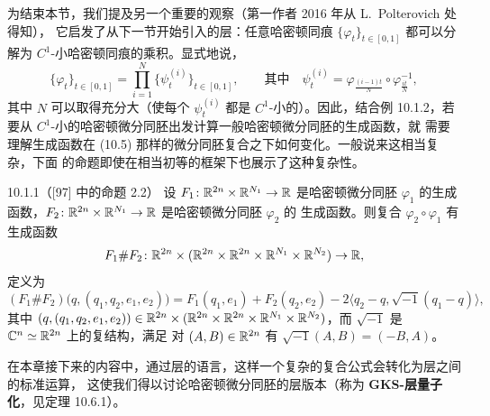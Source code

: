 为结束本节，我们提及另一个重要的观察（第一作者 2016 年从 L.~Polterovich 处得知），
它启发了从下一节开始引入的层：任意哈密顿同痕 $\{\varphi_t\}_{t\in[0,1]}$ 都可以分解为
$C^1$-小哈密顿同痕的乘积。显式地说，
\begin{equation}\tag{10.5}
  \{\varphi_t\}_{t\in[0,1]}
  =\prod_{i=1}^{N}\{\psi_t^{(i)}\}_{t\in[0,1]},
  \qquad\text{其中}\quad
  \psi_t^{(i)}=\varphi_{\frac{(i-1)t}{N}}\circ\varphi_{\frac{it}{N}}^{-1},
\end{equation}
其中 $N$ 可以取得充分大（使每个 $\psi_t^{(i)}$ 都是 $C^1$-小的）。因此，结合例
10.1.2，若要从 $C^1$-小的哈密顿微分同胚出发计算一般哈密顿微分同胚的生成函数，就
需要理解生成函数在 (10.5) 那样的微分同胚复合之下如何变化。一般说来这相当复杂，下面
的命题即使在相当初等的框架下也展示了这种复杂性。


\begin{wprop}{10.1.1（[97] 中的命题 2.2）}
  设 $F_1\colon\mathbb{R}^{2n}\times\mathbb{R}^{N_1}\to\mathbb{R}$ 是哈密顿微分同胚 $\varphi_1$ 的生成
  函数，$F_2\colon\mathbb{R}^{2n}\times\mathbb{R}^{N_1}\to\mathbb{R}$ 是哈密顿微分同胚 $\varphi_2$ 的
  生成函数。则复合 $\varphi_2\circ\varphi_1$ 有生成函数
  \[
    F_1\#F_2\colon\mathbb{R}^{2n}\times(\mathbb{R}^{2n}\times\mathbb{R}^{2n}\times\mathbb{R}^{N_1}\times\mathbb{R}^{N_2})
    \to\mathbb{R},
  \]
  定义为
  \[
    (F_1\#F_2)\bigl(q,(q_1,q_2,e_1,e_2)\bigr)
    =F_1(q_1,e_1)+F_2(q_2,e_2)
    -2\bigl\langle q_2-q,\sqrt{-1}(q_1-q)\bigr\rangle,
  \]
  其中
  $(q,(q_1,q_2,e_1,e_2))\in\mathbb{R}^{2n}\times(\mathbb{R}^{2n}\times\mathbb{R}^{2n}\times\mathbb{R}^{N_1}
  \times\mathbb{R}^{N_2})$，而 $\sqrt{-1}$ 是 $\mathbb{C}^n\simeq\mathbb{R}^{2n}$ 上的复结构，满足
  对 $(A,B)\in\mathbb{R}^{2n}$ 有 $\sqrt{-1}(A,B)=(-B,A)$。
\end{wprop}


在本章接下来的内容中，通过层的语言，这样一个复杂的复合公式会转化为层之间的标准运算，
这使我们得以讨论哈密顿微分同胚的层版本（称为 \textbf{GKS-层量子化}，见定理 10.6.1）。
